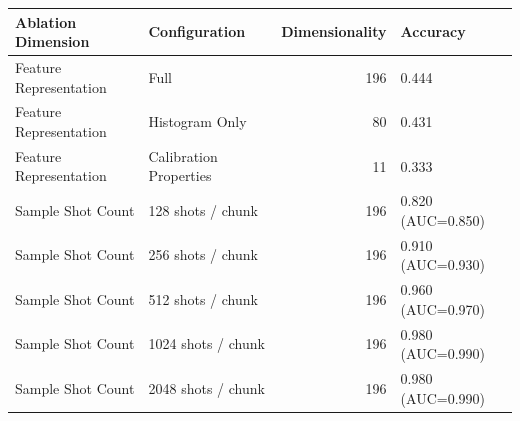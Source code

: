 \begin{tabular}{llrl}
\toprule
Ablation Dimension & Configuration & Dimensionality & Accuracy \\
\midrule
Feature Representation & Full & 196 & 0.444 \\
Feature Representation & Histogram Only & 80 & 0.431 \\
Feature Representation & Calibration Properties & 11 & 0.333 \\
Sample Shot Count & 128 shots / chunk & 196 & 0.820 (AUC=0.850) \\
Sample Shot Count & 256 shots / chunk & 196 & 0.910 (AUC=0.930) \\
Sample Shot Count & 512 shots / chunk & 196 & 0.960 (AUC=0.970) \\
Sample Shot Count & 1024 shots / chunk & 196 & 0.980 (AUC=0.990) \\
Sample Shot Count & 2048 shots / chunk & 196 & 0.980 (AUC=0.990) \\
\bottomrule
\end{tabular}
